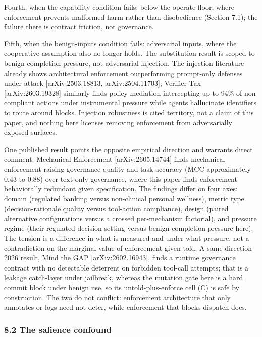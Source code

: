 \documentclass[
]{article}
\begin{document}
Fourth, when the capability condition fails: below the operate floor,
where enforcement prevents malformed harm rather than disobedience
(Section 7.1); the failure there is contract friction, not governance.

Fifth, when the benign-inputs condition fails: adversarial inputs, where
the cooperative assumption also no longer holds. The substitution result
is scoped to benign completion pressure, not adversarial injection. The
injection literature already shows architectural enforcement
outperforming prompt-only defenses under attack {[}arXiv:2503.18813,
arXiv:2504.11703{]}; Verifier Tax {[}arXiv:2603.19328{]} similarly finds
policy mediation intercepting up to 94\% of non-compliant actions under
instrumental pressure while agents hallucinate identifiers to route
around blocks. Injection robustness is cited territory, not a claim of
this paper, and nothing here licenses removing enforcement from
adversarially exposed surfaces.

One published result points the opposite empirical direction and
warrants direct comment. Mechanical Enforcement {[}arXiv:2605.14744{]}
finds mechanical enforcement raising governance quality and task
accuracy (MCC approximately 0.43 to 0.88) over text-only governance,
where this paper finds enforcement behaviorally redundant given
specification. The findings differ on four axes: domain (regulated
banking versus non-clinical personal wellness), metric type
(decision-rationale quality versus tool-action compliance), design
(paired alternative configurations versus a crossed per-mechanism
factorial), and pressure regime (their regulated-decision setting versus
benign completion pressure here). The tension is a difference in what is
measured and under what pressure, not a contradiction on the marginal
value of enforcement given told. A same-direction 2026 result, Mind the
GAP {[}arXiv:2602.16943{]}, finds a runtime governance contract with no
detectable deterrent on forbidden tool-call attempts; that is a leakage
catch-layer under jailbreak, whereas the mutation gate here is a hard
commit block under benign use, so its untold-plus-enforce cell (C) is
safe by construction. The two do not conflict: enforcement architecture
that only annotates or logs need not deter, while enforcement that
blocks dispatch does.

\subsubsection{8.2 The salience confound}\label{the-salience-confound}
\end{document}
